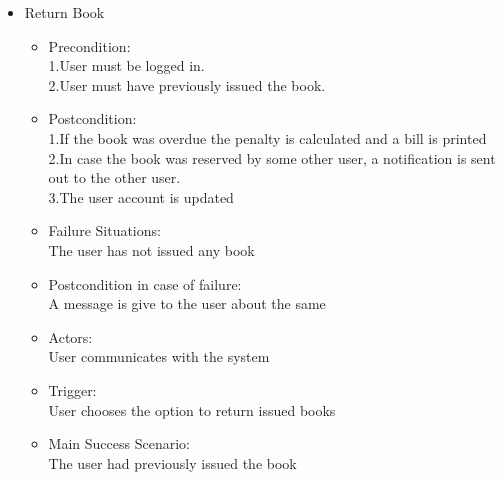\documentclass{article}
\begin{document}
\begin{enumerate}
\begin{itemize}
 \item Return Book\\
 \begin{itemize}
 \item Precondition:\\
 1.User must be logged in.\\
 2.User must have previously issued the book.\\
 \item Postcondition:\\
 1.If the book was overdue the penalty is calculated and a bill is printed\\ 
 2.In case the book was reserved by some other user, a notification is sent out to the other user.\\
 3.The user account is updated\\
 \item Failure Situations:\\The user has not issued any book\\
 \item Postcondition in case of failure:\\A message is give to the user about the same\\
 \item Actors:\\ User communicates with the system\\
 \item Trigger:\\ User chooses the option to return issued books\\
\item  Main Success Scenario: \\The user had previously issued the book\\
 \end{itemize}
 

\end{itemize}
\end{enumerate}
\end{document}
